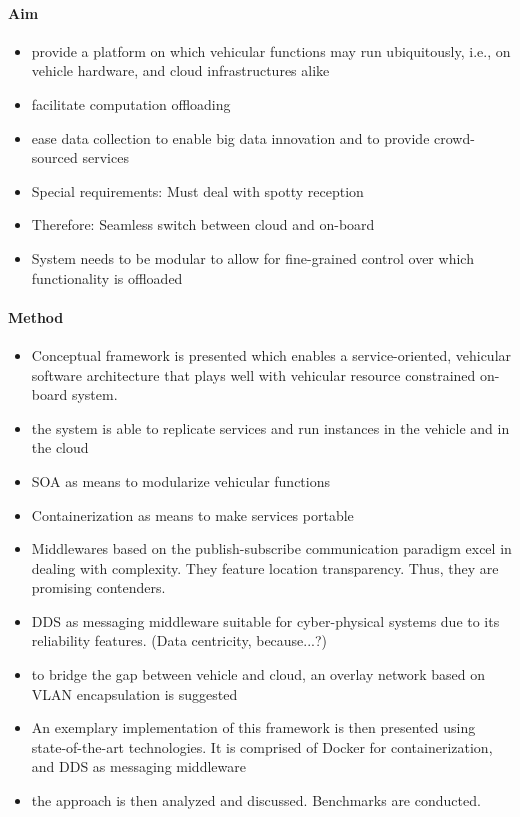 \noindent
\paragraph{Aim}
\begin{itemize}
\item provide a platform on which vehicular functions may run ubiquitously, i.e., on vehicle hardware, and cloud infrastructures alike
\item facilitate computation offloading
\item ease data collection to enable big data innovation and to provide crowd-sourced services
\item Special requirements: Must deal with spotty reception
\item Therefore: Seamless switch between cloud and on-board
\item System needs to be modular to allow for fine-grained control over which functionality is offloaded
\end{itemize}

\noindent
\paragraph{Method}
\begin{itemize}
\item Conceptual framework is presented which enables a service-oriented, vehicular software architecture that plays well with vehicular resource constrained on-board system.
\item the system is able to replicate services and run instances in the vehicle and in the cloud
\item SOA as means to modularize vehicular functions 
\item Containerization as means to make services portable
\item Middlewares based on the publish-subscribe communication paradigm excel in dealing with complexity. They feature location transparency. Thus, they are promising contenders. 
\item DDS as messaging middleware suitable for cyber-physical systems due to its reliability features. (Data centricity, because...?)
\item to bridge the gap between vehicle and cloud, an overlay network based on VLAN encapsulation is suggested
\item  An exemplary implementation of this framework is then presented using state-of-the-art technologies. It is comprised of Docker for containerization, and DDS as messaging middleware
\item the approach is then analyzed and discussed. Benchmarks are conducted.
\end{itemize}

